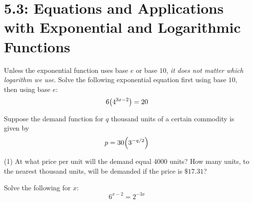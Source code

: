 \documentclass[../mathNotesPreamble]{subfiles}
\begin{document}
  \section{5.3: Equations and Applications with Exponential and Logarithmic Functions}
    \begin{center}
    \end{center}
    \begin{ex*}
      Unless the exponential function uses base $e$ or base $10$, \emph{it does not matter which logarithm we use}. Solve the following exponential equation first using base $10$, then using base $e$:
        \[6{\left(4^{3x-2}\right)}=20\]
    \end{ex*}
    \pagebreak

    \begin{ex*}
      Suppose the demand function for $q$ thousand units of a certain commodity is given by
        \[p=30{\left(3^{-q/2}\right)}\]
    \end{ex*}
    \begin{extasks}[after-item-skip=\stretch{0.5}](1)
      \task At what price per unit will the demand equal 4000 units?
      \task How many units, to the nearest thousand units, will be demanded if the price is $\$17.31$?
    \end{extasks}
    \begin{ex*}
      Solve the following for $x$:
        \[6^{x-2}=2^{-3x}\]
    \end{ex*}
    \pagebreak
    
\end{document}
